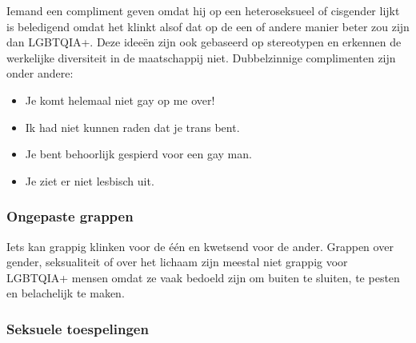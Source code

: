 \documentclass[12pt,openany]{book}
\begin{document}
Iemand een compliment geven omdat hij op een heteroseksueel of cisgender lijkt is beledigend omdat het klinkt alsof dat op de een of andere manier beter zou zijn dan LGBTQIA+. Deze ideeën zijn ook gebaseerd op stereotypen en erkennen de werkelijke diversiteit in de maatschappij niet. Dubbelzinnige complimenten zijn onder andere: 

\begin{figure}[h]
    \centering
\end{figure}
\begin{itemize}
  \setlength\itemsep{-0.3em}
  \item Je komt helemaal niet gay op me over!
  \item Ik had niet kunnen raden dat je trans bent.
  \item Je bent behoorlijk gespierd voor een gay man.
  \item Je ziet er niet lesbisch uit.
\end{itemize}

\subsubsection*{Ongepaste grappen} 

Iets kan grappig klinken voor de één en kwetsend voor de ander. Grappen over gender, seksualiteit of over het lichaam zijn meestal niet grappig voor LGBTQIA+ mensen omdat ze vaak bedoeld zijn om buiten te sluiten, te pesten en belachelijk te maken. 

\subsubsection*{Seksuele toespelingen}
\end{document}
